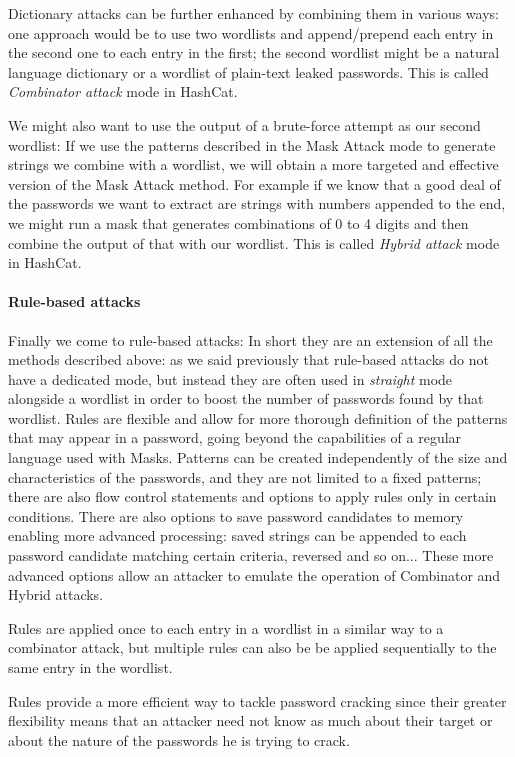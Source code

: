 Dictionary attacks can be further enhanced by combining them in various ways: one approach would be to use two wordlists and append/prepend each entry in the second one to each entry in the first; 
the second wordlist might be a natural language dictionary or a wordlist of plain-text leaked passwords. This is called \emph{Combinator attack} mode in HashCat. 

We might also want to use the output of a brute-force attempt as our second wordlist: If we use the patterns described in the Mask Attack mode to generate strings we combine with a wordlist, we will obtain a more targeted and effective version of the Mask Attack method. 
For example if we know that a good deal of the passwords we want to extract are strings with numbers appended to the end, we might run a mask that generates combinations of 0 to 4 digits and then combine the output of that with our wordlist. This is called \emph{Hybrid attack} mode in HashCat.

\paragraph{Rule-based attacks}\label{par:rule-based}
Finally we come to rule-based attacks: In short they are an extension of all the methods described above: as we said previously that rule-based attacks do not have a dedicated mode, but instead they are often used in \emph{straight} mode alongside a wordlist in order to boost the number of passwords found by that wordlist.
Rules are flexible and allow for more thorough definition of the patterns that may appear in a password, going beyond the capabilities of a regular language used with Masks.
Patterns can be created independently of the size and characteristics of the passwords, and they are not limited to a fixed patterns; there are also flow control statements and options to apply rules only in certain conditions.
There are also options to save password candidates to memory enabling more advanced processing: saved strings can be appended to each password candidate matching certain criteria, reversed and so on...
These more advanced options allow an attacker to emulate the operation of Combinator and Hybrid attacks. 

Rules are applied once to each entry in a wordlist in a similar way to a combinator attack, but multiple rules can also be be applied sequentially to the same entry in the wordlist.

Rules provide a more efficient way to tackle password cracking since their greater flexibility means that an attacker need not know as much about their target or about the nature of the passwords he is trying to crack. 

